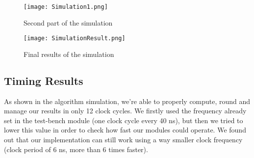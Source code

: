 \begin{figure}[h]
	\centering
	\captionsetup{justification=centering}
	\texttt{[image: Simulation1.png]}	
	\caption{Second part of the simulation}
\end{figure}
\begin{figure}[h]
	\centering
	\captionsetup{justification=centering}
	\texttt{[image: SimulationResult.png]}	
	\caption{Final results of the simulation}
	\label{simRes}
\end{figure}


\subsection{Timing Results}
As shown in the algorithm simulation, we're able to properly compute, round and manage our results in only 12 clock cycles. We firstly used the frequency already set in the test-bench module (one clock cycle every 40 ns), but then we tried to lower this value in order to check how fast our modules could operate. We found out that our implementation can still work using a way smaller clock frequency (clock period of 6 ns, more than 6 times faster). 
\clearpage